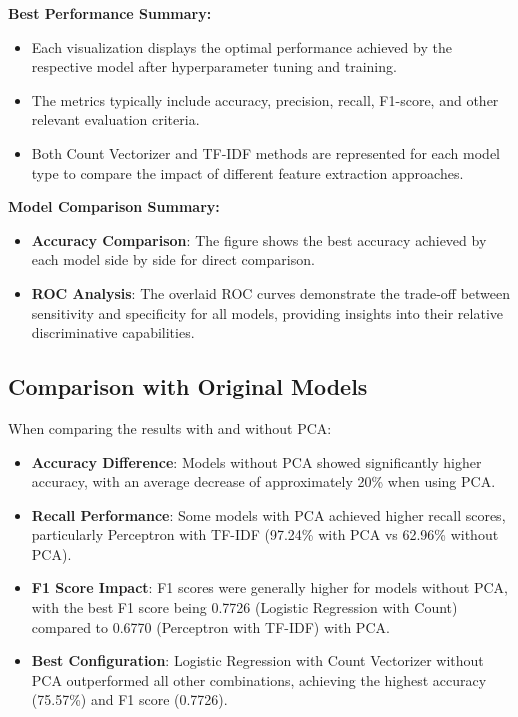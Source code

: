 \textbf{Best Performance Summary:}
\begin{itemize}
    \item Each visualization displays the optimal performance achieved by the respective model after hyperparameter tuning and training.
    \item The metrics typically include accuracy, precision, recall, F1-score, and other relevant evaluation criteria.
    \item Both Count Vectorizer and TF-IDF methods are represented for each model type to compare the impact of different feature extraction approaches.
\end{itemize}


\textbf{Model Comparison Summary:}
\begin{itemize}
    \item \textbf{Accuracy Comparison}: The figure shows the best accuracy achieved by each model side by side for direct comparison.
    \item \textbf{ROC Analysis}: The overlaid ROC curves demonstrate the trade-off between sensitivity and specificity for all models, providing insights into their relative discriminative capabilities.
\end{itemize}
\subsection{Comparison with Original Models}
When comparing the results with and without PCA:
\begin{itemize}
    \item \textbf{Accuracy Difference}: Models without PCA showed significantly higher accuracy, with an average decrease of approximately 20\% when using PCA.
    \item \textbf{Recall Performance}: Some models with PCA achieved higher recall scores, particularly Perceptron with TF-IDF (97.24\% with PCA vs 62.96\% without PCA).
    \item \textbf{F1 Score Impact}: F1 scores were generally higher for models without PCA, with the best F1 score being 0.7726 (Logistic Regression with Count) compared to 0.6770 (Perceptron with TF-IDF) with PCA.
    \item \textbf{Best Configuration}: Logistic Regression with Count Vectorizer without PCA outperformed all other combinations, achieving the highest accuracy (75.57\%) and F1 score (0.7726).
\end{itemize}

